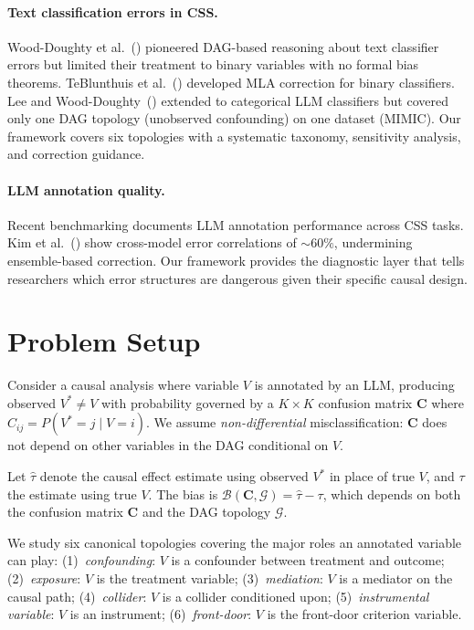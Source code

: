 \documentclass[11pt,letterpaper]{article}
\begin{document}
\paragraph{Text classification errors in CSS.}
Wood-Doughty et al.~(\citeyear{wooddoughty2018}) pioneered DAG-based reasoning about text classifier errors but limited their treatment to binary variables with no formal bias theorems.
TeBlunthuis et al.~(\citeyear{teblunthuis2024}) developed MLA correction for binary classifiers.
Lee and Wood-Doughty~(\citeyear{lee2024}) extended to categorical LLM classifiers but covered only one DAG topology (unobserved confounding) on one dataset (MIMIC).
Our framework covers six topologies with a systematic taxonomy, sensitivity analysis, and correction guidance.

\paragraph{LLM annotation quality.}
Recent benchmarking \cite{ziems2024,jerzak2025} documents LLM annotation performance across CSS tasks.
Kim et al.~(\citeyear{kim2025}) show cross-model error correlations of ${\sim}60\%$, undermining ensemble-based correction.
Our framework provides the diagnostic layer that tells researchers which error structures are dangerous given their specific causal design.

\section{Problem Setup}
\label{sec:setup}

Consider a causal analysis where variable $V$ is annotated by an LLM, producing observed $V^* \neq V$ with probability governed by a $K \times K$ confusion matrix $\mathbf{C}$ where $C_{ij} = P(V^* = j \mid V = i)$.
We assume \emph{non-differential} misclassification: $\mathbf{C}$ does not depend on other variables in the DAG conditional on $V$.

Let $\hat{\tau}$ denote the causal effect estimate using observed $V^*$ in place of true $V$, and $\tau$ the estimate using true $V$.
The bias is $\mathcal{B}(\mathbf{C}, \mathcal{G}) = \hat{\tau} - \tau$, which depends on both the confusion matrix $\mathbf{C}$ and the DAG topology $\mathcal{G}$.

We study six canonical topologies covering the major roles an annotated variable can play:
(1)~\emph{confounding}: $V$ is a confounder between treatment and outcome;
(2)~\emph{exposure}: $V$ is the treatment variable;
(3)~\emph{mediation}: $V$ is a mediator on the causal path;
(4)~\emph{collider}: $V$ is a collider conditioned upon;
(5)~\emph{instrumental variable}: $V$ is an instrument;
(6)~\emph{front-door}: $V$ is the front-door criterion variable.
\end{document}
